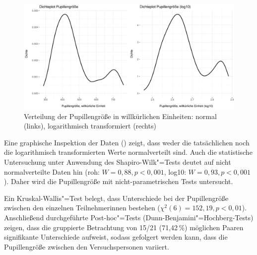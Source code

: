 

\begin{figure}
    \includegraphics[width=\textwidth]{Figures/EyeTracking/DD/ggplot_DD-PSize_density_de}
	\caption{Verteilung der Pupillengröße in willkürlichen Einheiten: normal (links), logarithmisch transformiert (rechts)}
	\label{K6:fig:DD:density-PSize}
\end{figure}


Eine graphische Inspektion der Daten () zeigt, dass weder die tatsächlichen noch die logarithmisch transformierten Werte normalverteilt sind. Auch die statistische Untersuchung unter Anwendung des Shapiro-Wilk"=Tests deutet auf nicht normalverteilte Daten hin (roh: $W = 0,88, p < 0,001$, log10: $W = 0,93, p < 0,001$). Daher wird die Pupillengröße mit nicht-parametrischen Tests untersucht.

Ein Kruskal-Wallis"=Test belegt, dass Unterschiede bei der Pupillengröße zwischen den einzelnen Teilnehmer{\textperiodcentered}innen bestehen ($\chi^2(6) = 152,19, p < 0,01$). Anschließend durchgeführte Post-hoc"=Tests (Dunn-Benjamini"=Hochberg-Tests) zeigen, dass die gruppierte Betrachtung von 15/21 (71,42\,\%) möglichen Paaren signifikante Unterschiede aufweist, sodass gefolgert werden kann, dass die Pupillengröße zwischen den Versuchspersonen variiert.


